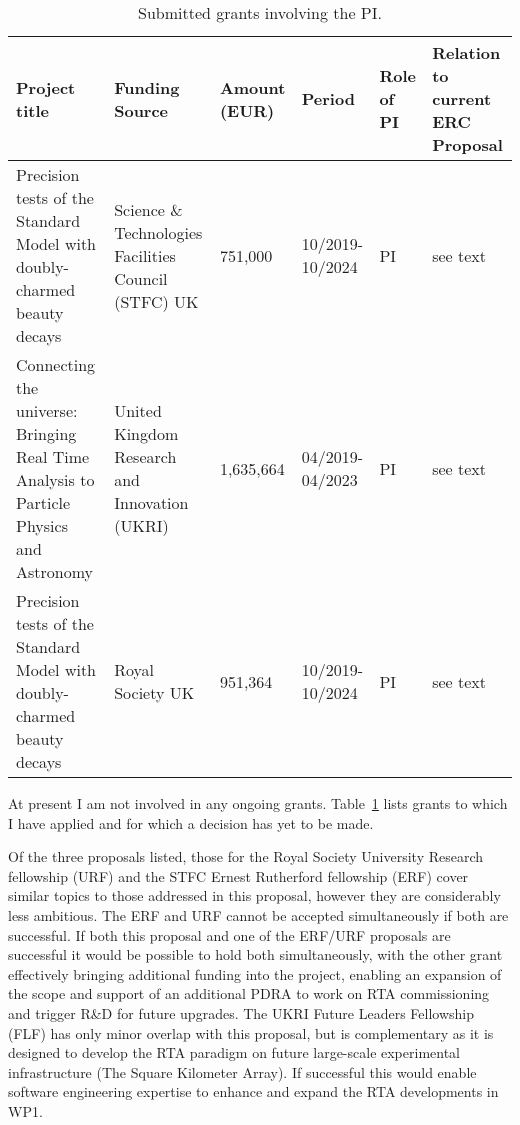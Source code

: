 \begin{table}[ht]
    \centering
\begin{tabular}{p{3.5cm}|p{3cm}|p{1.4cm}|p{1.5cm}|p{1cm}|p{2.3cm}}
    Project title & Funding Source& Amount (EUR) & Period & Role of PI & Relation to current ERC Proposal \\ \hline\hline
    Precision tests of the Standard Model with doubly-charmed beauty decays & Science \& Technologies Facilities Council (STFC) UK & 751,000 & 10/2019-10/2024 & PI & see text \\ \hline
   Connecting the universe: Bringing Real Time Analysis to Particle Physics and Astronomy  & United Kingdom Research and Innovation (UKRI) & 1,635,664 & 04/2019-04/2023 & PI & see text \\ \hline
    Precision tests of the Standard Model with doubly-charmed beauty decays & Royal Society UK & 951,364 & 10/2019-10/2024 & PI & see text\\ \hline
\end{tabular}
\caption{Submitted grants involving the PI.}
    \label{tab:grants}
\end{table}

\noindent
At present I am not involved in any ongoing grants.  
Table~\ref{tab:grants} lists grants to which I have applied and for which a decision has yet to be made.

Of the three proposals listed, those for the Royal Society University Research fellowship (URF) and the STFC Ernest Rutherford fellowship (ERF) cover similar topics to those addressed in this proposal, however they are considerably less ambitious. The ERF and URF cannot be accepted simultaneously if both are successful. If both this proposal and one of the ERF/URF proposals are successful it would be possible to hold both simultaneously, with the other grant effectively bringing additional funding into the project, enabling an expansion of the scope and support of an additional PDRA to work on RTA commissioning and trigger R\&D for future upgrades. 
The UKRI Future Leaders Fellowship (FLF) has only minor overlap with this proposal, but is complementary as it is designed to develop the RTA paradigm on future large-scale experimental infrastructure (The Square Kilometer Array). If successful this would enable software engineering expertise to enhance and expand the RTA developments in WP1.